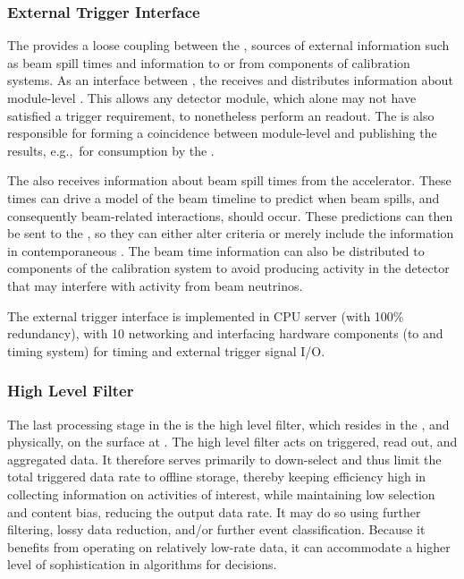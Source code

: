\subsubsection{External Trigger Interface}

The  provides a loose coupling between the
, sources of external information such as beam spill times
and information to or from components of  
calibration systems. As an interface between , the  receives and distributes information about module-level  .
This allows any detector module, which alone may not have satisfied a  trigger requirement, to nonetheless perform an  readout.
The  is also responsible for forming a coincidence between module-level   and publishing the results, e.g.,~for consumption by the .

The  also receives information about beam spill times from the accelerator.
These times can drive a model of the beam timeline to predict when
beam spills, and consequently beam-related interactions, should occur. 
These predictions can then be sent to the , so they
can either alter  criteria or merely include the
information in contemporaneous . The beam time information can also be distributed to components of the calibration system to avoid producing activity in the detector that may interfere with activity from beam neutrinos.

The external trigger interface is implemented in  CPU server (with 100\%
redundancy), with \SI{10}{\Gbps} networking and interfacing hardware
components (to  and  timing system) for timing and external trigger signal I/O.

\subsubsection{High Level Filter}
\label{sec:fd-daq:design-data-reduction}

The last processing stage in the  is the
high level filter, which resides in the , and physically,
on the surface at .
The high level filter acts on triggered, read out, and aggregated data. 
It therefore serves primarily to down-select and thus
limit the total triggered data rate to offline storage, thereby keeping 
efficiency high in collecting information on activities of interest,
while maintaining low selection and content bias, reducing the output data
rate. It may do so using 
further filtering, lossy data reduction, and/or further event
classification.
Because it benefits from operating on relatively low-rate data, it can accommodate a higher level of
sophistication in algorithms for  decisions.

